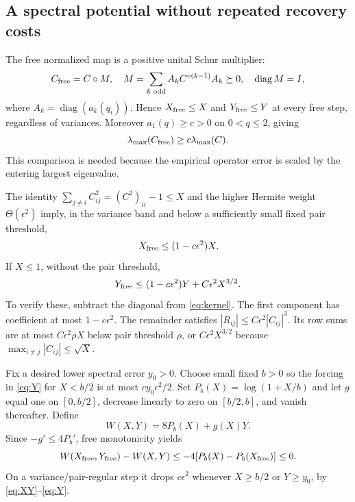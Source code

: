 \documentclass[11pt]{article}
\newcommand{\diag}{\operatorname{diag}}\newcommand{\sech}{\operatorname{sech}}
\newcommand{\Had}{\mathbin{\circ}}\newcommand{\one}{\mathbf1}
\begin{document}
\subsection{A spectral potential without repeated recovery costs}
The free normalized map is a positive unital Schur multiplier:
\begin{equation}\label{eq:schur}
 C_{\rm free}=C\Had M,\quad
 M=\sum_{k\text{ odd}}A_k C^{\Had(k-1)}A_k\succeq0,\quad\diag M=I,
\end{equation}
where $A_k=\diag(a_k(q_i))$. Hence $X_{\rm free}\le X$ and $Y_{\rm free}\le Y$ at every free step, regardless of variances. Moreover $a_1(q)\ge c>0$ on $0<q\le2$, giving
\begin{equation}\label{eq:spectralcompare}
 \lambda_{\max}(C_{\rm free})\ge c\lambda_{\max}(C).
\end{equation}
This comparison is needed because the empirical operator error is scaled by the entering largest eigenvalue.

The identity $\sum_{j\ne i}C_{ij}^2=(C^2)_{ii}-1\le X$ and the higher Hermite weight $\Theta(\epsilon^2)$ imply, in the variance band and below a sufficiently small fixed pair threshold,
\begin{equation}\label{eq:XY}
 X_{\rm free}\le(1-c\epsilon^2)X.
\end{equation}
If $X\le1$, without the pair threshold,
\begin{equation}\label{eq:Y}
 Y_{\rm free}\le(1-c\epsilon^2)Y+C\epsilon^2X^{3/2}.
\end{equation}
To verify these, subtract the diagonal from \eqref{eq:kernel}. The first component has coefficient at most $1-c\epsilon^2$. The remainder satisfies $|R_{ij}|\le C\epsilon^2|C_{ij}|^3$. Its row sums are at most $C\epsilon^2\rho X$ below pair threshold $\rho$, or $C\epsilon^2X^{3/2}$ because $\max_{i\ne j}|C_{ij}|\le\sqrt X$.

Fix a desired lower spectral error $y_0>0$. Choose small fixed $b>0$ so the forcing in \eqref{eq:Y} for $X<b/2$ is at most $cy_0\epsilon^2/2$. Set $P_b(X)=\log(1+X/b)$ and let $g$ equal one on $[0,b/2]$, decrease linearly to zero on $[b/2,b]$, and vanish thereafter. Define
\begin{equation}\label{eq:W}
 W(X,Y)=8P_b(X)+g(X)Y.
\end{equation}
Since $-g'\le4P_b'$, free monotonicity yields
\[
 W(X_{\rm free},Y_{\rm free})-W(X,Y)
 \le-4[P_b(X)-P_b(X_{\rm free})]\le0.
\]
On a variance/pair-regular step it drops $c\epsilon^2$ whenever $X\ge b/2$ or $Y\ge y_0$, by \eqref{eq:XY}--\eqref{eq:Y}.
\end{document}
